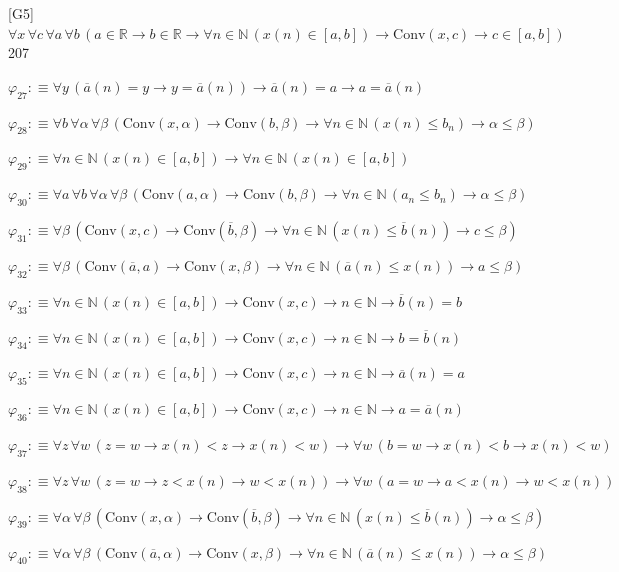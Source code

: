 \begin{fullproof}{[G5]}{$\forall x\,\forall c\,\forall a\,\forall b\,(a \in \mathbb{R} \to b \in \mathbb{R} \to \forall n \in \mathbb{N}\,(x(n) \in [a,b]) \to \mathrm{Conv}(x,c) \to c \in [a,b])$}{207}
\begin{abbrevlist}
\item $\varphi_{27} :\equiv \forall y\,(\overline{a}(n) = y \to y = \overline{a}(n)) \to \overline{a}(n) = a \to a = \overline{a}(n)$
\item $\varphi_{28} :\equiv \forall b\,\forall \alpha\,\forall \beta\,(\mathrm{Conv}(x,\alpha) \to \mathrm{Conv}(b,\beta) \to \forall n \in \mathbb{N}\,(x(n) \leq b_{n}) \to \alpha \leq \beta)$
\item $\varphi_{29} :\equiv \forall n \in \mathbb{N}\,(x(n) \in [a,b]) \to \forall n \in \mathbb{N}\,(x(n) \in [a,b])$
\item $\varphi_{30} :\equiv \forall a\,\forall b\,\forall \alpha\,\forall \beta\,(\mathrm{Conv}(a,\alpha) \to \mathrm{Conv}(b,\beta) \to \forall n \in \mathbb{N}\,(a_{n} \leq b_{n}) \to \alpha \leq \beta)$
\item $\varphi_{31} :\equiv \forall \beta\,(\mathrm{Conv}(x,c) \to \mathrm{Conv}(\overline{b},\beta) \to \forall n \in \mathbb{N}\,(x(n) \leq \overline{b}(n)) \to c \leq \beta)$
\item $\varphi_{32} :\equiv \forall \beta\,(\mathrm{Conv}(\overline{a},a) \to \mathrm{Conv}(x,\beta) \to \forall n \in \mathbb{N}\,(\overline{a}(n) \leq x(n)) \to a \leq \beta)$
\item $\varphi_{33} :\equiv \forall n \in \mathbb{N}\,(x(n) \in [a,b]) \to \mathrm{Conv}(x,c) \to n \in \mathbb{N} \to \overline{b}(n) = b$
\item $\varphi_{34} :\equiv \forall n \in \mathbb{N}\,(x(n) \in [a,b]) \to \mathrm{Conv}(x,c) \to n \in \mathbb{N} \to b = \overline{b}(n)$
\item $\varphi_{35} :\equiv \forall n \in \mathbb{N}\,(x(n) \in [a,b]) \to \mathrm{Conv}(x,c) \to n \in \mathbb{N} \to \overline{a}(n) = a$
\item $\varphi_{36} :\equiv \forall n \in \mathbb{N}\,(x(n) \in [a,b]) \to \mathrm{Conv}(x,c) \to n \in \mathbb{N} \to a = \overline{a}(n)$
\item $\varphi_{37} :\equiv \forall z\,\forall w\,(z = w \to x(n) < z \to x(n) < w) \to \forall w\,(b = w \to x(n) < b \to x(n) < w)$
\item $\varphi_{38} :\equiv \forall z\,\forall w\,(z = w \to z < x(n) \to w < x(n)) \to \forall w\,(a = w \to a < x(n) \to w < x(n))$
\item $\varphi_{39} :\equiv \forall \alpha\,\forall \beta\,(\mathrm{Conv}(x,\alpha) \to \mathrm{Conv}(\overline{b},\beta) \to \forall n \in \mathbb{N}\,(x(n) \leq \overline{b}(n)) \to \alpha \leq \beta)$
\item $\varphi_{40} :\equiv \forall \alpha\,\forall \beta\,(\mathrm{Conv}(\overline{a},\alpha) \to \mathrm{Conv}(x,\beta) \to \forall n \in \mathbb{N}\,(\overline{a}(n) \leq x(n)) \to \alpha \leq \beta)$

\end{abbrevlist}
\end{fullproof}
